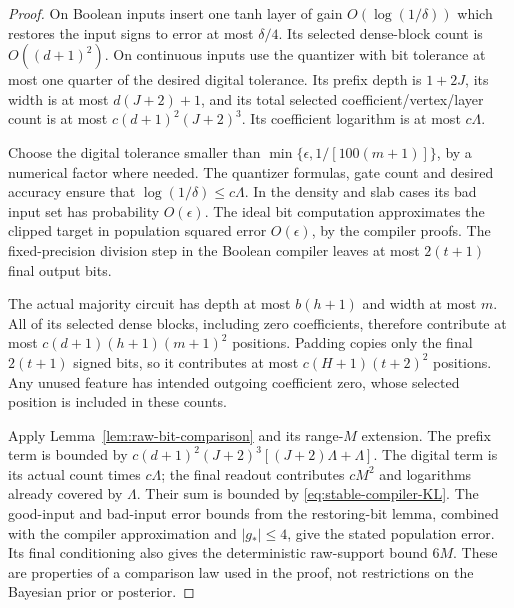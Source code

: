 \begin{proof}
On Boolean inputs insert one tanh layer of gain $O(\log(1/\delta))$
which restores the input signs to error at most $\delta/4$.
Its selected dense-block count is $O((d+1)^2)$.  On continuous inputs
use the quantizer with bit tolerance at most one quarter of the desired
digital tolerance.  Its prefix depth is $1+2J$, its width is at most
$d(J+2)+1$, and its total selected coefficient/vertex/layer count is at
most $c(d+1)^2(J+2)^3$.  Its coefficient logarithm is at most $c\Lambda$.

Choose the digital tolerance smaller than
$\min\{\epsilon,1/[100(m+1)]\}$, by a numerical factor where needed.
The quantizer formulas, gate count and desired accuracy ensure that
$\log(1/\delta)\le c\Lambda$.  In the density and slab cases its bad
input set has probability $O(\epsilon)$.  The ideal bit computation
approximates the clipped target in population squared error
$O(\epsilon)$, by the compiler proofs.  The fixed-precision division
step in the Boolean compiler leaves at most $2(t+1)$ final output bits.

The actual majority circuit has depth at most $b(h+1)$ and width at most
$m$.  All of its selected dense blocks, including zero coefficients,
therefore contribute at most $c(d+1)(h+1)(m+1)^2$ positions.  Padding
copies only the final $2(t+1)$ signed bits, so it contributes at most
$c(H+1)(t+2)^2$ positions.  Any unused feature has intended outgoing
coefficient zero, whose selected position is included in these counts.

Apply Lemma~\ref{lem:raw-bit-comparison} and its range-$M$ extension.
The prefix term is bounded by
$c(d+1)^2(J+2)^3[(J+2)\Lambda+\Lambda]$.
The digital term is its actual count times $c\Lambda$; the final
readout contributes $cM^2$ and logarithms already covered by $\Lambda$.
Their sum is bounded by \eqref{eq:stable-compiler-KL}.
The good-input and bad-input error bounds from the restoring-bit lemma,
combined with the compiler approximation and $|g_*|\le4$, give the stated
population error.  Its final conditioning also gives the deterministic
raw-support bound $6M$.  These are properties of a comparison law used
in the proof, not restrictions on the Bayesian prior or posterior.
\end{proof}
